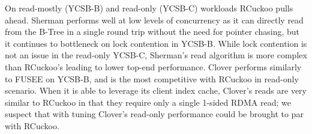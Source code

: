 On read-mostly (YCSB-B) and read-only (YCSB-C) workloads RCuckoo
pulls ahead.
Sherman performs
well at low levels of concurrency as it can directly read from the B-Tree
in a single round trip without the need for pointer chasing, but it
continues to bottleneck on lock contention in YCSB-B.  While lock contention is not an issue in the read-only YCSB-C, Sherman's read
algorithm is more complex than RCuckoo's leading to lower top-end
performance. Clover performs similarly to FUSEE on YCSB-B, and is the
most competitive with RCuckoo in read-only scenario.  When it is able
to leverage its client index cache, Clover's reads are very similar to
RCuckoo in that they require only a single 1-sided RDMA read; we
suspect that with tuning Clover's read-only performance could be
brought to par with RCuckoo.

